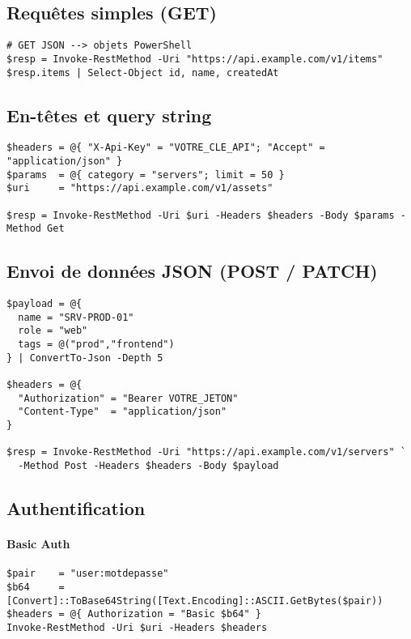 \documentclass[a4paper,12pt]{article}
\begin{document}
\subsection{Requêtes simples (GET)}
\begin{verbatim}
# GET JSON --> objets PowerShell
$resp = Invoke-RestMethod -Uri "https://api.example.com/v1/items"
$resp.items | Select-Object id, name, createdAt
\end{verbatim}

\subsection{En-têtes et query string}
\begin{verbatim}
$headers = @{ "X-Api-Key" = "VOTRE_CLE_API"; "Accept" = "application/json" }
$params  = @{ category = "servers"; limit = 50 }
$uri     = "https://api.example.com/v1/assets"

$resp = Invoke-RestMethod -Uri $uri -Headers $headers -Body $params -Method Get
\end{verbatim}

\subsection{Envoi de données JSON (POST / PATCH)}
\begin{verbatim}
$payload = @{
  name = "SRV-PROD-01"
  role = "web"
  tags = @("prod","frontend")
} | ConvertTo-Json -Depth 5

$headers = @{
  "Authorization" = "Bearer VOTRE_JETON"
  "Content-Type"  = "application/json"
}

$resp = Invoke-RestMethod -Uri "https://api.example.com/v1/servers" `
  -Method Post -Headers $headers -Body $payload
\end{verbatim}

\subsection{Authentification}
\paragraph{Basic Auth}
\begin{verbatim}
$pair    = "user:motdepasse"
$b64     = [Convert]::ToBase64String([Text.Encoding]::ASCII.GetBytes($pair))
$headers = @{ Authorization = "Basic $b64" }
Invoke-RestMethod -Uri $uri -Headers $headers
\end{verbatim}
\end{document}
